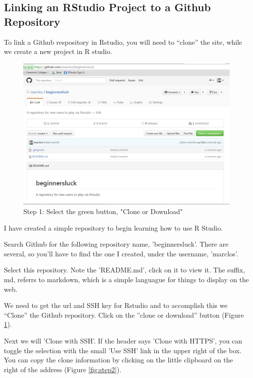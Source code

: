 \documentclass[12pt]{../SOP3_beta}
\begin{document}
\subsection{Linking an RStudio Project to a Github Repository}

\NP To link a Github respository in Rstudio, you will need to ``clone'' the site, while we create a new project in R studio.


\begin{figure}[H]
\includegraphics{graphics/CloningGithub.jpg}
\caption{Step 1: Select the green button, "Clone or Download"}
\label{fig:step1}
\end{figure}

\NP I have created a simple repository to begin learning how to use R Studio.

\NP Search Github for the following repository name, 'beginnersluck'. There are several, so you'll have to find the one I created, under the username, 'marclos'. 

\NP Select this repository. Note the 'README.md', click on it to view it. The suffix, md, referrs to markdown, which is a simple languague for things to display on the web.

\NP We need to get the url and SSH key for Rstudio and to accomplish this we ``Clone'' the Github repository. Click on the ''clone or download'' button (Figure \ref{fig:step1}).


\NP Next we will 'Clone with SSH'. If the header says 'Clone with HTTPS', you can toggle the selection with the small 'Use SSH' link in the upper right of the box. You can copy the clone information by clicking on the little clipboard on the right of the address (Figure \ref{fig:step2}).
\end{document}
